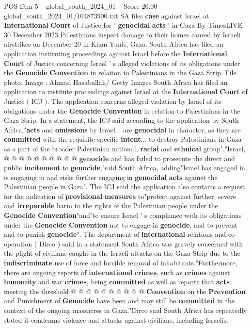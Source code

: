 \begin{textsample}{POS Dim 5 – global\_south\_2024\_01 – Score 20.00 – global\_south\_2024\_01/104873900.txt}  \label{ex:f5_pos_009}
SA files \textbf{case} against Israel at \textbf{International} \textbf{Court} of Justice for ' \textbf{genocidal} \textbf{acts} ' in Gaza By TimesLIVE - 30 December 2023 Palestinians inspect damage to their homes caused by Israeli airstrikes on December 20 in Khan Yunis, Gaza.
South Africa has filed an application instituting proceedings against Israel before the \textbf{International} \textbf{Court} of Justice concerning Israel ' s alleged violations of its obligations under the \textbf{Genocide} \textbf{Convention} in relation to Palestinians in the Gaza Strip.
File photo.
Image : Ahmad Hasaballah/ Getty Images South Africa has filed an application to institute proceedings against Israel at the \textbf{International} \textbf{Court} of Justice ( ICJ ).
The application concerns alleged violation by Israel of its obligations under the \textbf{Genocide} \textbf{Convention} in relation to Palestinians in the Gaza Strip.
In a statement, the ICJ said according to the application by South Africa,"\textbf{acts} and \textbf{omissions} by Israel... are \textbf{genocidal} in character, as they are \textbf{committed} with the requisite specific \textbf{intent}... to destroy Palestinians in Gaza as a part of the broader Palestinian national, \textbf{racial} and \textbf{ethnical} group"."Israel, @ @ @ @ @ @ @ @ @ @ \textbf{genocide} and has failed to prosecute the direct and public \textbf{incitement} to \textbf{genocide},"said South Africa, adding"Israel has engaged in, is engaging in and risks further engaging in \textbf{genocidal} \textbf{acts} against the Palestinian people in Gaza".
The ICJ said the application also contains a request for the indication of \textbf{provisional} \textbf{measures} to"protect against further, severe and \textbf{irreparable} harm to the rights of the Palestinian people under the \textbf{Genocide} \textbf{Convention}"and"to ensure Israel ' s compliance with its obligations under the \textbf{Genocide} \textbf{Convention} not to engage in \textbf{genocide}, and to prevent and to punish \textbf{genocide}".
The department of \textbf{international} relations and co-operation ( Dirco ) said in a statement South Africa was gravely concerned with the plight of civilians caught in the Israeli attacks on the Gaza Strip due to the \textbf{indiscriminate} use of force and forcible removal of inhabitants."Furthermore, there are ongoing reports of \textbf{international} \textbf{crimes}, such as \textbf{crimes} against \textbf{humanity} and war \textbf{crimes}, being \textbf{committed} as well as reports that \textbf{acts} meeting the threshold @ @ @ @ @ @ @ @ @ @ \textbf{Convention} on the \textbf{Prevention} and Punishment of \textbf{Genocide} have been and may still be \textbf{committed} in the context of the ongoing massacres in Gaza."Dirco said South Africa has repeatedly stated it condemns violence and attacks against civilians, including Israelis.

\end{textsample}
